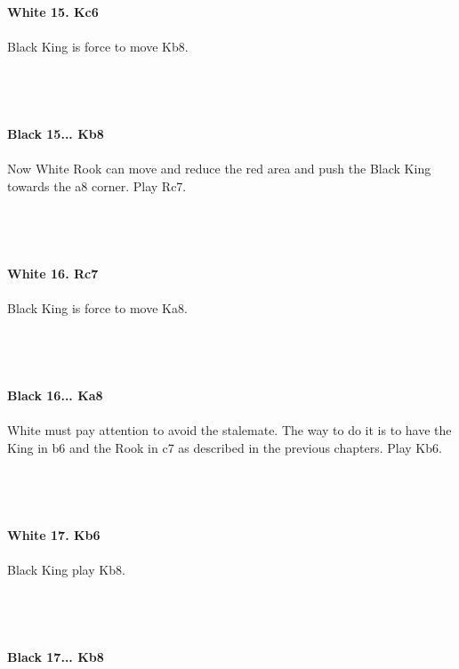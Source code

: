 \documentclass{article}
\begin{document}
\\

\\
\\
\textbf{White 15. Kc6}\\
\\
Black King is force to move Kb8.\\\\
\\

\\
\\
\textbf{Black 15... Kb8}\\
\\
Now White Rook can move and reduce the red area and push the Black King towards the a8 corner. Play Rc7.\\\\
\\

\\
\\
\textbf{White 16. Rc7}\\
\\
Black King is force to move Ka8.\\\\
\\

\\
\\
\textbf{Black 16... Ka8}\\
\\
White must pay attention to avoid the stalemate. The way to do it is to have the King in b6 and the Rook in c7 as described in the previous chapters. Play Kb6.\\\\
\\

\\
\\
\textbf{White 17. Kb6}\\
\\
Black King play Kb8.\\\\
\\

\\
\\
\textbf{Black 17... Kb8}\\
\end{document}
